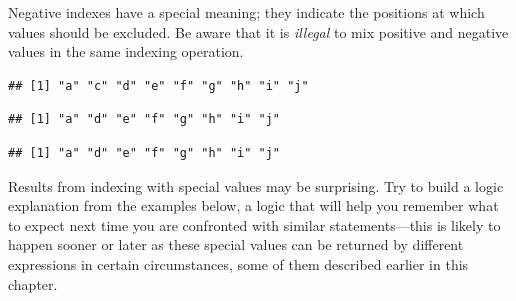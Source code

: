 \documentclass[krantz2]{krantz}\usepackage{knitr}
\begin{document}
Negative indexes have a special meaning; they indicate the positions at which values should be excluded. Be aware that it is \emph{illegal} to mix positive and negative values in the same indexing operation.

\begin{knitrout}\footnotesize
{}\color{fgcolor}\begin{kframe}
\begin{alltt}
\hlstd{a[}\hlopt{-}\hlstd{]}
\end{alltt}
\begin{verbatim}
## [1] "a" "c" "d" "e" "f" "g" "h" "i" "j"
\end{verbatim}
\begin{alltt}
\hlstd{a[}\hlopt{-}\hlstd{(}\hlstd{,}\hlstd{)]}
\end{alltt}
\begin{verbatim}
## [1] "a" "d" "e" "f" "g" "h" "i" "j"
\end{verbatim}
\begin{alltt}
\hlstd{a[}\hlopt{-}\hlopt{:-}\hlstd{]}
\end{alltt}
\begin{verbatim}
## [1] "a" "d" "e" "f" "g" "h" "i" "j"
\end{verbatim}
\end{kframe}
\end{knitrout}

\begin{advplayground}
Results from indexing with special values may be surprising. Try to build a logic explanation from the examples below, a logic that will help you remember what to expect next time you are confronted with similar statements---this is likely to happen sooner or later as these special values can be returned by different \Rlang expressions in certain circumstances, some of them described earlier in this chapter.

\begin{knitrout}\footnotesize
{}\color{fgcolor}\begin{kframe}
\begin{alltt}
\hlstd{a[}\hlstd{]}
\hlstd{a[}\hlstd{(}\hlstd{)]}
\hlstd{a[}\hlstd{]}
\hlstd{a[}\hlstd{(}\hlstd{,} \hlstd{)]}
\hlstd{a[}\hlstd{]}
\hlstd{a[}\hlstd{(}\hlstd{,} \hlstd{)]}
\end{alltt}
\end{kframe}
\end{knitrout}
\end{advplayground}
\end{document}

